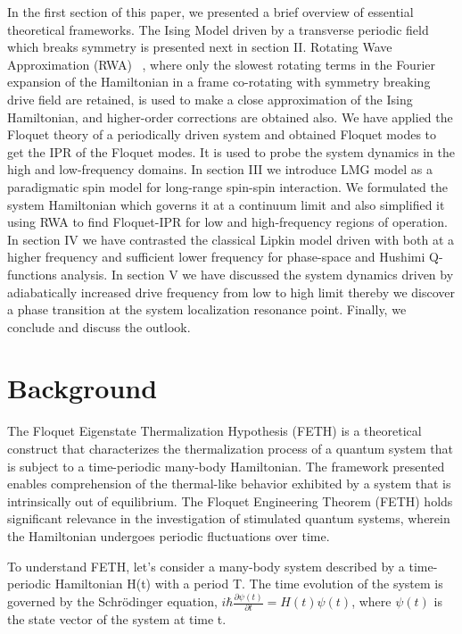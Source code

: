\documentclass[%
reprint,
superscriptaddress,
amsmath,amssymb,
aps,
prb,
]{revtex4-2}
\begin{document}
	In the first section of this paper, we presented a brief overview of essential theoretical frameworks. The Ising Model driven by a transverse periodic field which breaks symmetry is presented next in section II. Rotating Wave Approximation (RWA) ~\cite{fujii_introduction_2017}, where only the slowest rotating terms in the Fourier expansion of the Hamiltonian in a frame co-rotating with symmetry breaking drive field are retained, is used to make a close approximation of the Ising Hamiltonian, and higher-order corrections are obtained also. We have applied the Floquet theory of a periodically driven system and obtained Floquet modes to get the IPR of the Floquet modes. It is used to probe the system dynamics in the high and low-frequency domains. In section III we introduce  LMG model as a paradigmatic spin model for long-range spin-spin interaction. We formulated the system Hamiltonian which governs it at a continuum limit and also simplified it using RWA to find Floquet-IPR for low and high-frequency regions of operation. In section IV we have contrasted the classical Lipkin model driven with both at a higher frequency and sufficient lower frequency for phase-space and Hushimi Q-functions analysis. In section V we have discussed the  system dynamics driven by adiabatically increased drive frequency from low to high limit thereby we discover a phase transition at the system localization resonance point. Finally, we conclude and discuss the outlook. 
	
\section{\label{sec:background} Background}
	
The Floquet Eigenstate Thermalization Hypothesis (FETH) is a theoretical construct that characterizes the thermalization process of a quantum system that is subject to a time-periodic many-body Hamiltonian. The framework presented enables comprehension of the thermal-like behavior exhibited by a system that is intrinsically out of equilibrium. The Floquet Engineering Theorem (FETH) holds significant relevance in the investigation of stimulated quantum systems, wherein the Hamiltonian undergoes periodic fluctuations over time.

To understand FETH, let's consider a many-body system described by a time-periodic Hamiltonian H(t) with a period T. The time evolution of the system is governed by the Schrödinger equation, $i\hbar \frac{\partial{\psi(t)}}{\partial{t}} = H(t)\psi(t)$, where $\psi(t)$ is the state vector of the system at time t.
\end{document}
